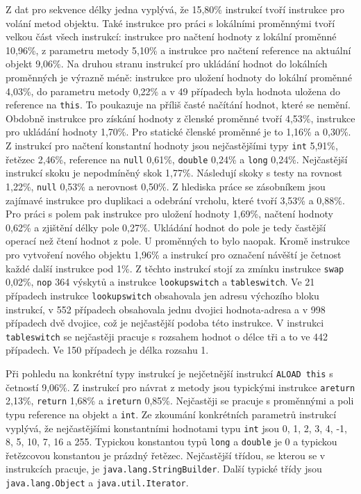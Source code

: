 Z dat pro sekvence délky jedna vyplývá, že 15,80\% instrukcí tvoří instrukce pro volání metod objektu. Také instrukce pro práci s lokálními proměnnými tvoří velkou část všech instrukcí: instrukce pro načtení hodnoty z lokální proměnné 10,96\%, z parametru metody 5,10\% a instrukce pro načtení reference na aktuální objekt 9,06\%. Na druhou stranu instrukcí pro ukládání hodnot do lokálních proměnných je výrazně méně: instrukce pro uložení hodnoty do lokální proměnné 4,03\%, do parametru metody 0,22\% a v 49 případech byla hodnota uložena do reference na \texttt{this}. To poukazuje na příliš časté načítání hodnot, které se nemění. Obdobně instrukce pro získání hodnoty z členské proměnné tvoří 4,53\%, instrukce pro ukládání hodnoty 1,70\%. Pro statické členské proměnné je to 1,16\% a 0,30\%. Z instrukcí pro načtení konstantní hodnoty jsou nejčastějšími typy \texttt{int} 5,91\%, řetězec 2,46\%, reference na \texttt{null} 0,61\%, \texttt{double} 0,24\% a \texttt{long} 0,24\%. Nejčastější instrukcí skoku je nepodmíněný skok 1,77\%. Následují skoky s testy na rovnost 1,22\%, \texttt{null} 0,53\% a nerovnost 0,50\%. Z hlediska práce se zásobníkem jsou zajímavé instrukce pro duplikaci a odebrání vrcholu, které tvoří 3,53\% a 0,88\%. Pro práci s polem pak instrukce pro uložení hodnoty 1,69\%, načtení hodnoty 0,62\% a zjištění délky pole 0,27\%. Ukládání hodnot do pole je tedy častější operací než čtení hodnot z pole. U proměnných to bylo naopak. Kromě instrukce pro vytvoření nového objektu 1,96\% a instrukcí pro označení návěští je četnost každé další instrukce pod 1\%. Z těchto instrukcí stojí za zmínku instrukce \texttt{swap} 0,02\%, \texttt{nop} 364 výskytů a instrukce \texttt{lookupswitch} a \texttt{tableswitch}. Ve 21 případech instrukce \texttt{lookupswitch} obsahovala jen adresu výchozího bloku instrukcí, v 552 případech obsahovala jednu dvojici hodnota-adresa a v 998 případech dvě dvojice, což je nejčastější podoba této instrukce. V instrukci \texttt{tableswitch} se nejčastěji pracuje s rozsahem hodnot o délce tři a to ve 442 případech. Ve 150 případech je délka rozsahu 1.


Při pohledu na konkrétní typy instrukcí je nejčetnější instrukcí \texttt{ALOAD this} s četností 9,06\%. Z instrukcí pro návrat z metody jsou typickými instrukce \texttt{areturn} 2,13\%, \texttt{return} 1,68\% a \texttt{ireturn} 0,85\%. Nejčastěji se pracuje s proměnnými a poli typu reference na objekt a \texttt{int}. Ze zkoumání konkrétních parametrů instrukcí vyplývá, že nejčastějšími konstantními hodnotami typu \texttt{int} jsou 0, 1, 2, 3, 4, -1, 8, 5, 10, 7, 16 a 255. Typickou konstantou typů \texttt{long} a \texttt{double} je 0 a typickou řetězcovou konstantou je prázdný řetězec. Nejčastější třídou, se kterou se v instrukcích pracuje, je \texttt{java.lang.StringBuilder}. Další typické třídy jsou \texttt{java.lang.Object} a \texttt{java.util.Iterator}.

